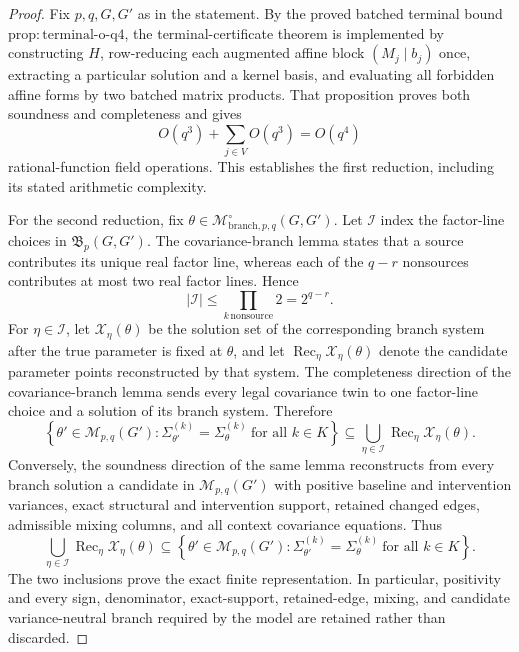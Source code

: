 \documentclass{article}
\begin{document}
\begin{proof}
Fix \(p,q,G,G'\) as in the statement.  By the proved batched terminal bound \(\mathrm{prop:terminal\text{-}o\text{-}q4}\), the terminal-certificate theorem is implemented by constructing \(H\), row-reducing each augmented affine block \((M_j\mid b_j)\) once, extracting a particular solution and a kernel basis, and evaluating all forbidden affine forms by two batched matrix products.  That proposition proves both soundness and completeness and gives
\[
 O(q^3)+\sum_{j\in V}O(q^3)=O(q^4)
\]
rational-function field operations.  This establishes the first reduction, including its stated arithmetic complexity.

For the second reduction, fix \(\theta\in\mathcal M^{\circ}_{\mathrm{branch},p,q}(G,G')\).  Let \(\mathcal I\) index the factor-line choices in \(\mathfrak B_p(G,G')\).  The covariance-branch lemma states that a source contributes its unique real factor line, whereas each of the \(q-r\) nonsources contributes at most two real factor lines.  Hence
\[
 |\mathcal I|\le \prod_{k\,\mathrm{nonsource}}2=2^{q-r}.
\]
For \(\eta\in\mathcal I\), let \(\mathcal X_\eta(\theta)\) be the solution set of the corresponding branch system after the true parameter is fixed at \(\theta\), and let \(\operatorname{Rec}_\eta\mathcal X_\eta(\theta)\) denote the candidate parameter points reconstructed by that system.  The completeness direction of the covariance-branch lemma sends every legal covariance twin to one factor-line choice and a solution of its branch system.  Therefore
\[
 \left\{\theta'\in\mathcal M_{p,q}(G'):
   \Sigma_{\theta'}^{(k)}=\Sigma_{\theta}^{(k)}\ \text{for all }k\in K\right\}
 \subseteq
 \bigcup_{\eta\in\mathcal I}\operatorname{Rec}_\eta\mathcal X_\eta(\theta).
\]
Conversely, the soundness direction of the same lemma reconstructs from every branch solution a candidate in \(\mathcal M_{p,q}(G')\) with positive baseline and intervention variances, exact structural and intervention support, retained changed edges, admissible mixing columns, and all context covariance equations.  Thus
\[
 \bigcup_{\eta\in\mathcal I}\operatorname{Rec}_\eta\mathcal X_\eta(\theta)
 \subseteq
 \left\{\theta'\in\mathcal M_{p,q}(G'):
   \Sigma_{\theta'}^{(k)}=\Sigma_{\theta}^{(k)}\ \text{for all }k\in K\right\}.
\]
The two inclusions prove the exact finite representation.  In particular, positivity and every sign, denominator, exact-support, retained-edge, mixing, and candidate variance-neutral branch required by the model are retained rather than discarded.


\end{proof}
\end{document}
